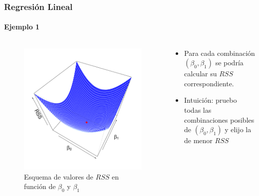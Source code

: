 \documentclass{beamer}
\begin{document}
\begin{frame}
\frametitle{Regresión Lineal}
\framesubtitle{Ejemplo 1}
\begin{columns}
	\begin{column}{0.5\textwidth}
		\centering
		\begin{figure}[h]
			\includegraphics[width=0.95\linewidth, height=0.6\textheight]{./img/pdf/3_2b}
			\caption{Esquema de valores de $RSS$ en función de $\beta_{0}$ y $\beta_{1}$ \cite{hastie02}}
		\end{figure}
	\end{column}
	\begin{column}{0.35\textwidth}
		\begin{itemize}
			\item Para cada combinación $(\beta_{0}, \beta_{1})$ se podría calcular su $RSS$ correspondiente.
			\item Intuición: pruebo todas las combinaciones posibles de $(\beta_{0}, \beta_{1})$ y elijo la de menor $RSS$
		\end{itemize}
	\end{column}
\end{columns}
\end{frame}
\end{document}
